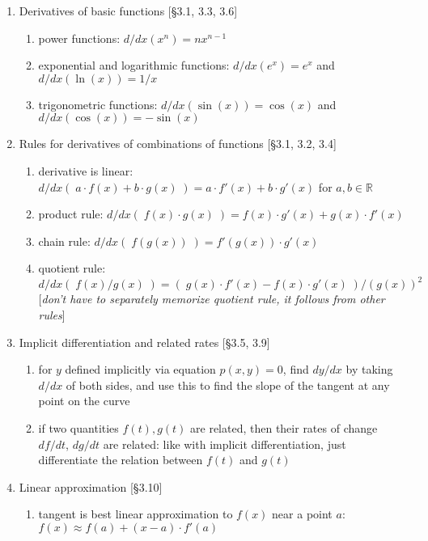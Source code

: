 \documentclass[11pt]{article}
\begin{document}
\begin{enumerate}
\item Derivatives of basic functions [\S 3.1, 3.3, 3.6]
\begin{enumerate}
\item power functions: $d/dx (x^n) = n x^{n-1}$
\item exponential and logarithmic functions: $d/dx(e^x) = e^x$ and $d/dx(\ln(x)) = 1/x$
\item trigonometric functions: $d/dx(\sin(x)) = \cos(x)$ and $d/dx(\cos(x)) = -\sin(x)$
\end{enumerate}

\item Rules for derivatives of combinations of functions [\S 3.1, 3.2, 3.4]
\begin{enumerate}
\item derivative is linear: $d/dx( \; a\cdot f(x) + b\cdot g(x) \;) = a \cdot f'(x) + b \cdot g'(x)$ for $a,b \in \mathbb{R}$
\item product rule: $d/dx( \; f(x)\cdot g(x) \;) = f(x) \cdot g'(x) + g(x) \cdot f'(x)$
\item chain rule: $d/dx (\; f(g(x)) \; ) = f'(g(x)) \cdot g'(x)$
\item quotient rule: $\displaystyle d/dx (\; f(x)/g(x) \;) = (\; g(x)\cdot f'(x) - f(x)\cdot g'(x) \; )/(g(x))^2$\\ {[\emph{don't have to separately memorize quotient rule, it follows from other rules}]}
\end{enumerate}

\item Implicit differentiation and related rates [\S 3.5, 3.9]
\begin{enumerate}
\item for $y$ defined implicitly via equation $p(x,y)=0$, find $dy/dx$ by taking $d/dx$ of both sides, and use this to find the slope of the tangent at any point on the curve
\item if two quantities $f(t), g(t)$ are related, then their rates of change $df/dt$, $dg/dt$ are related: like with implicit differentiation, just differentiate the relation between $f(t)$ and $g(t)$
\end{enumerate}

\item Linear approximation [\S 3.10]
\begin{enumerate}
\item tangent is best linear approximation to $f(x)$ near a point $a$: $f(x) \approx f(a) + (x-a) \cdot f'(a)$
\end{enumerate}


\end{enumerate}
\end{document}
